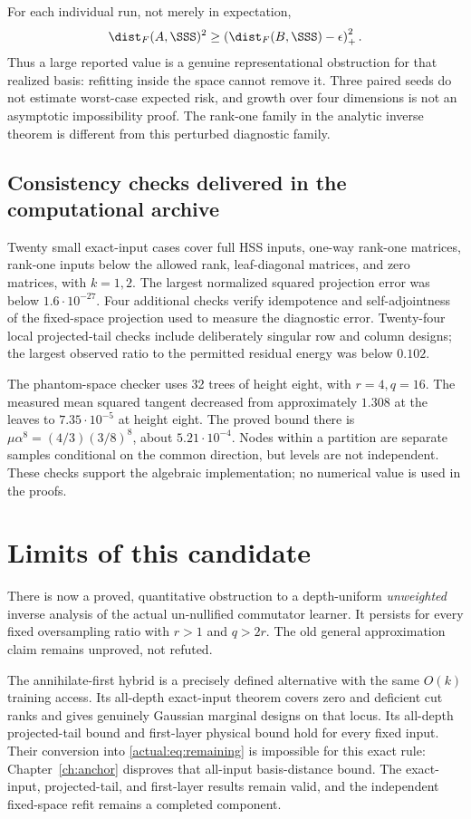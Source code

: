\documentclass[11pt,oneside,openany,a4paper]{book}
\numberwithin{equation}{chapter}
\theoremstyle{definition}
\theoremstyle{remark}
\begin{document}
For each individual run, not merely in expectation,
\begin{equation}\label{actual:eq:actual-lower}
 \dist_F(A,\SSS)^2\ge
 \left(\dist_F(B,\SSS)-\epsilon\right)_+^2.
\end{equation}
Thus a large reported value is a genuine representational obstruction for that realized basis: refitting inside the space cannot remove it. Three paired seeds do not estimate worst-case expected risk, and growth over four dimensions is not an asymptotic impossibility proof. The rank-one family in the analytic inverse theorem is different from this perturbed diagnostic family.

\subsection{Consistency checks delivered in the computational archive}
Twenty small exact-input cases cover full HSS inputs, one-way rank-one matrices, rank-one inputs below the allowed rank, leaf-diagonal matrices, and zero matrices, with $k=1,2$. The largest normalized squared projection error was below $1.6\cdot10^{-27}$. Four additional checks verify idempotence and self-adjointness of the fixed-space projection used to measure the diagnostic error. Twenty-four local projected-tail checks include deliberately singular row and column designs; the largest observed ratio to the permitted residual energy was below $0.102$.

The phantom-space checker uses 32 trees of height eight, with $r=4,q=16$. The measured mean squared tangent decreased from approximately $1.308$ at the leaves to $7.35\cdot10^{-5}$ at height eight. The proved bound there is $\mu\alpha^8=(4/3)(3/8)^8$, about $5.21\cdot10^{-4}$. Nodes within a partition are separate samples conditional on the common direction, but levels are not independent. These checks support the algebraic implementation; no numerical value is used in the proofs.

\section{Limits of this candidate}
There is now a proved, quantitative obstruction to a depth-uniform \emph{unweighted} inverse analysis of the actual un-nullified commutator learner. It persists for every fixed oversampling ratio with $r>1$ and $q>2r$. The old general approximation claim remains unproved, not refuted.

The annihilate-first hybrid is a precisely defined alternative with the same $O(k)$ training access. Its all-depth exact-input theorem covers zero and deficient cut ranks and gives genuinely Gaussian marginal designs on that locus. Its all-depth projected-tail bound and first-layer physical bound hold for every fixed input. Their conversion into \eqref{actual:eq:remaining} is impossible for this exact rule: Chapter~\ref{ch:anchor} disproves that all-input basis-distance bound. The exact-input, projected-tail, and first-layer results remain valid, and the independent fixed-space refit remains a completed component.
\end{document}
